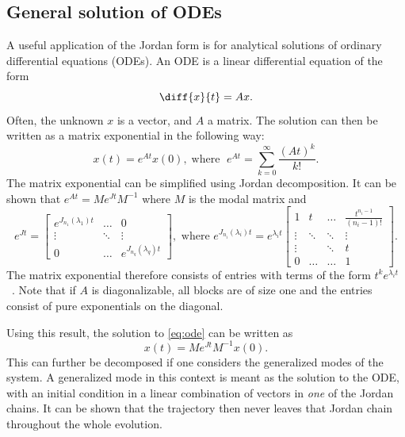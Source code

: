 \documentclass[../main.tex]{subfiles}
\begin{document}
\subsection{General solution of ODEs}
A useful application of the Jordan form is for analytical solutions of ordinary differential equations (ODEs). An ODE is a linear differential equation of the form
\begin{equation}\label{eq:ode}
    \diff{x}{t}=Ax. 
\end{equation}
Often, the unknown $x$ is a vector, and $A$ a matrix. The solution can then be written as a matrix exponential in the following way:
\begin{equation}
    x(t) = e^{At}x(0), \;\text{where } \;e^{At} = \sum_{k=0}^{\infty}\frac{(At)^k}{k!}.
\end{equation}
The matrix exponential can be simplified using Jordan decomposition. It can be shown that  $e^{At} = Me^{Jt}M^{-1}$ where $M$ is the modal matrix and
\begin{equation}\label{eq:expjordan}
        e^{Jt} = \begin{bmatrix}e^{J_{n_1}(\lambda_1)t} & \dots & 0 \\
                                                         \vdots & \ddots & \vdots \\
                                                         0 & \dots &  e^{J_{n_q}(\lambda_q)t}\end{bmatrix}, \text{ where } 
            e^{J_{n_i}(\lambda_i)t} = e^{\lambda_it} \begin{bmatrix} 1 & t & \dots & \frac{t^{n_i-1}}{(n_i-1)!}\\
                                                                \vdots  & \ddots & \ddots & \vdots \\
                                                                \vdots & & \ddots& t \\
                                                            0 & \dots & \dots & 1\ \end{bmatrix}.
\end{equation}
The matrix exponential therefore consists of entries with terms of the form $t^ke^{\lambda_it}$~\cite{uffe}. Note that if $A$ is diagonalizable, all blocks are of size one and the entries consist of pure exponentials on the diagonal. 

Using this result, the solution to \cref{eq:ode} can be written as 
\begin{equation}\label{jordanode}
    x(t) = Me^{Jt}M^{-1}x(0).
\end{equation}
This can further be decomposed if one considers the generalized modes of the system. A generalized mode in this context is meant as the solution to the ODE, with an initial condition in a linear combination of vectors in \textit{one} of the Jordan chains. It can be shown that the trajectory then never leaves that Jordan chain throughout the whole evolution.
\end{document}
